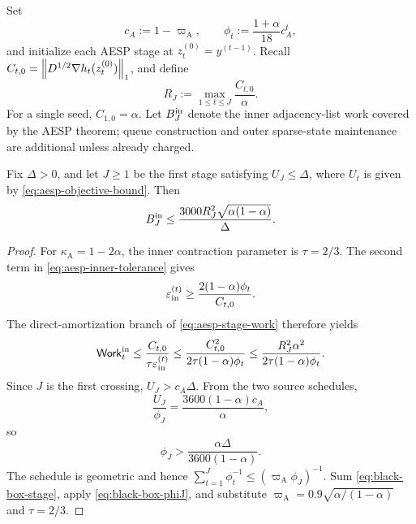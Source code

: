Set
\begin{equation}
  c_A:=1-\varpi_{\mathrm A},
  \qquad
  \phi_t:=\frac{1+\alpha}{18}c_A^t,
  \label{eq:black-box-phi}
\end{equation}
and initialize each AESP stage at
$z_t^{(0)}=y^{(t-1)}$.  Recall
$C_{t,0}=\left\lVert D^{1/2}\nabla h_t(z_t^{(0)})\right\rVert_1$, and define
\begin{equation}
  R_J:=\max_{1\leq t\leq J}\frac{C_{t,0}}{\alpha}.
  \label{eq:black-box-R}
\end{equation}
For a single seed, $C_{1,0}=\alpha$.  Let $B_J^{\rm in}$ denote the inner
adjacency-list work covered by the AESP theorem; queue construction and outer
sparse-state maintenance are additional unless already charged.

\begin{proposition}
\label{prop:black-box-burnin}
Fix $\Delta>0$, and let $J\geq1$ be the first stage satisfying
$U_J\leq\Delta$, where $U_t$ is given by
\cref{eq:aesp-objective-bound}.  Then
\begin{equation}
  B_J^{\rm in}
  \leq
  \frac{3000R_J^2\sqrt{\alpha(1-\alpha)}}{\Delta}.
  \label{eq:black-box-burnin}
\end{equation}
\end{proposition}

\begin{proof}
For $\kappa_{\mathrm A}=1-2\alpha$, the inner contraction parameter is $\tau=2/3$.
The second term in \cref{eq:aesp-inner-tolerance} gives
\[
  \varepsilon_{\mathrm{in}}^{(t)}\geq\frac{2(1-\alpha)\phi_t}{C_{t,0}}.
\]
The direct-amortization branch of \cref{eq:aesp-stage-work} therefore yields
\begin{equation}
  \mathsf{Work}_t^{\rm in}
  \leq
  \frac{C_{t,0}}{\tau\varepsilon_{\mathrm{in}}^{(t)}}
  \leq
  \frac{C_{t,0}^2}{2\tau(1-\alpha)\phi_t}
  \leq
  \frac{R_J^2\alpha^2}{2\tau(1-\alpha)\phi_t}.
  \label{eq:black-box-stage}
\end{equation}
Since $J$ is the first crossing, $U_J>c_A\Delta$.  From the two source
schedules,
\[
  \frac{U_J}{\phi_J}
  =\frac{3600(1-\alpha)c_A}{\alpha},
\]
so
\begin{equation}
  \phi_J>\frac{\alpha\Delta}{3600(1-\alpha)}.
  \label{eq:black-box-phiJ}
\end{equation}
The schedule is geometric and hence
$\sum_{t=1}^J\phi_t^{-1}\leq(\varpi_{\mathrm A}\phi_J)^{-1}$.
Sum \cref{eq:black-box-stage}, apply
\cref{eq:black-box-phiJ}, and substitute
$\varpi_{\mathrm A}=0.9\sqrt{\alpha/(1-\alpha)}$ and $\tau=2/3$.
\end{proof}

